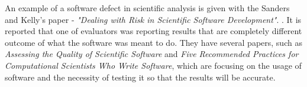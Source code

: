 An example of a software defect in scientific analysis is given with the Sanders and Kelly's paper - \textit{"Dealing with Risk in Scientific Software Development"}. \cite{sanders2008dealing}. It is reported that one of evaluators was reporting results that are completely different outcome of what the software was meant to do. They have several papers, such as \textit{Assessing the Quality of Scientific Software} and \textit{Five Recommended Practices
for Computational Scientists Who Write Software}, which are focusing on the usage of software and the necessity of testing it so that the results will be accurate. \cite{kellyassessing}\cite{kelly2009five} 

